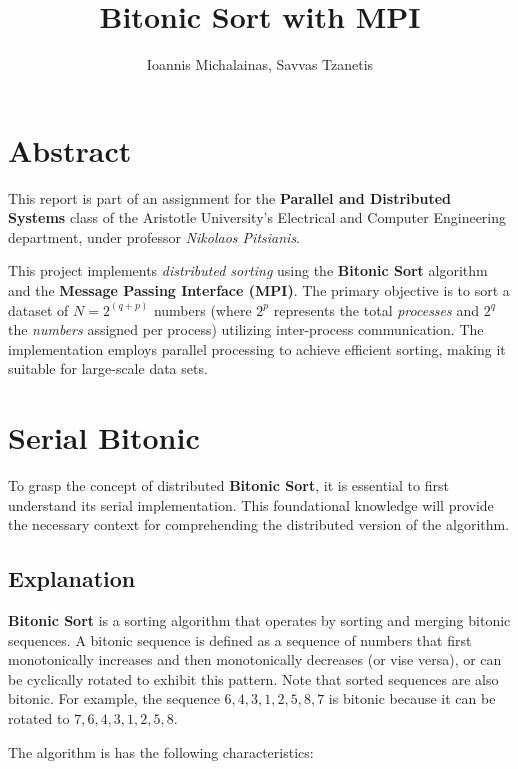 \documentclass[12pt]{report}
\begin{document}
\title{\textbf{Bitonic Sort with MPI}}
\author{Ioannis Michalainas, Savvas Tzanetis}
\maketitle

\tableofcontents

\chapter{Abstract}
This report is part of an assignment for the \textbf{Parallel and Distributed Systems} class of the
Aristotle University's Electrical and Computer Engineering department, under professor \textit{Nikolaos Pitsianis}. 

This project implements \textit{distributed sorting} using the \textbf{Bitonic Sort} algorithm and the \textbf{Message Passing Interface (MPI)}. The primary objective is to sort a dataset of $N = 2^{(q+p)}$ numbers (where $2^p$ represents the total \textit{processes} and $2^q$ the \textit{numbers} assigned per process) utilizing inter-process communication. The implementation employs parallel processing to achieve efficient sorting, making it suitable for large-scale data sets.

\chapter{Serial Bitonic}

To grasp the concept of distributed \textbf{Bitonic Sort}, it is essential to first understand its serial implementation. This foundational knowledge will provide the necessary context for comprehending the distributed version of the algorithm.

\section{Explanation}

\textbf{Bitonic Sort} is a sorting algorithm that operates by sorting and merging bitonic sequences. A bitonic sequence is defined as a sequence of numbers that first monotonically increases and then monotonically decreases (or vise versa), or can be cyclically rotated to exhibit this pattern. Note that sorted sequences are also bitonic. For example, the sequence $6, 4, 3, 1, 2, 5, 8, 7$ is bitonic because it can be rotated to $7, 6, 4, 3, 1, 2, 5, 8$. 

The algorithm is has the following characteristics:
\end{document}
